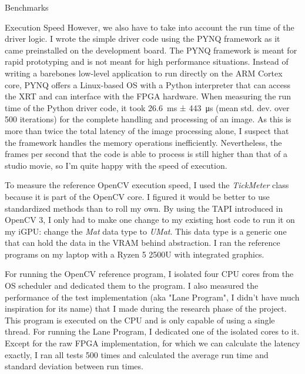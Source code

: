 \documentclass{matthijs}
\begin{document}
\begin{hoofdstuk}{Benchmarks}
\begin{paragraaf}{Execution Speed}
			However, we also have to take into account the run time of the driver logic.
			I wrote the simple driver code using the PYNQ framework as it came preinstalled on the development board.
			The PYNQ framework is meant for rapid prototyping and is not meant for high performance situations.
			Instead of writing a barebones low-level application to run directly on the ARM Cortex core, PYNQ offers a Linux-based OS with a Python interpreter that can access the XRT and can interface with the FPGA hardware.
			When measuring the run time of the Python driver code, it took \qty{26.6}{\milli\second} ± \qty{443}{\micro\second} (mean std. dev. over 500 iterations) for the complete handling and processing of an image.
			As this is more than twice the total latency of the image processing alone, I suspect that the framework handles the memory operations inefficiently.
			Nevertheless, the frames per second that the code is able to process is still higher than that of a studio movie, so I'm quite happy with the speed of execution.

			\bigskip

			To measure the reference OpenCV execution speed, I used the \textit{TickMeter} class because it is part of the OpenCV core.
			I figured it would be better to use standardized methods than to roll my own.
			By using the TAPI introduced in OpenCV 3, I only had to make one change to my existing host code to run it on my iGPU: change the \textit{Mat} data type to \textit{UMat}.
			This data type is a generic one that can hold the data in the VRAM behind abstraction.
			I ran the reference programs on my laptop with a Ryzen 5 2500U with integrated graphics.

			\bigskip
			\vspace{-0.5ex}

			For running the OpenCV reference program, I isolated four CPU cores from the OS scheduler and dedicated them to the program.
			I also measured the performance of the test implementation (aka "Lane Program", I didn't have much inspiration for its name) that I made during the research phase of the project.
			This program is executed on the CPU and is only capable of using a single thread.
			For running the Lane Program, I dedicated one of the isolated cores to it.
			Except for the raw FPGA implementation, for which we can calculate the latency exactly, I ran all tests 500 times and calculated the average run time and standard deviation between run times.

			\bigskip
			\vspace{-1.5ex}


\end{paragraaf}
\end{hoofdstuk}
\end{document}
